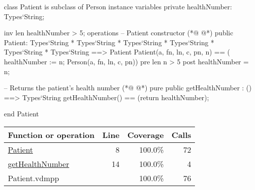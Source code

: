 \begin{vdmpp}[breaklines=true]
class Patient is subclass of Person
instance variables
  private healthNumber: Types`String;
  
  inv len healthNumber > 5;
operations
 -- Patient constructor
(*@
\label{Patient:8}
@*)
 public Patient: Types`String * Types`String * Types`String * Types`String * Types`String * Types`String ==> Patient
  Patient(a, fn, ln, c, pn, n) == ( healthNumber := n; Person(a, fn, ln, c, pn))
 pre len n > 5
 post healthNumber = n;
 
 -- Returns the patient's health number
(*@
\label{getHealthNumber:14}
@*)
 pure public getHealthNumber : () ==> Types`String
  getHealthNumber() == (return healthNumber);

end Patient
\end{vdmpp}
\bigskip
\begin{longtable}{|l|r|r|r|}
\hline
Function or operation & Line & Coverage & Calls \\
\hline
\hline
\hyperref[Patient:8]{Patient} & 8&100.0\% & 72 \\
\hline
\hyperref[getHealthNumber:14]{getHealthNumber} & 14&100.0\% & 4 \\
\hline
\hline
Patient.vdmpp & & 100.0\% & 76 \\
\hline
\end{longtable}

